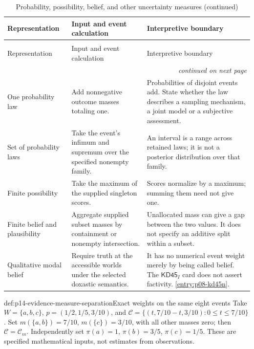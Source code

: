 \begin{longtable}{@{}p{}p{}p{}@{}}
\caption{Probability, possibility, belief, and other uncertainty measures}\\
\toprule
Representation & Input and event calculation & Interpretive boundary \\
\midrule
\endfirsthead
\caption[]{Probability, possibility, belief, and other uncertainty measures (continued)}\\
\toprule
Representation & Input and event calculation & Interpretive boundary \\
\midrule
\endhead
\midrule\multicolumn{3}{r}{\emph{continued on next page}}\\
\endfoot
\endlastfoot
One probability law & Add nonnegative outcome masses totaling one. &
Probabilities of disjoint events add. State whether the law describes a
sampling mechanism, a joint model or a subjective assessment. \\
Set of probability laws & Take the event's infimum and supremum over the
specified nonempty family. & An interval is a range across retained laws;
it is not a posterior distribution over that family. \\
Finite possibility & Take the maximum of the supplied singleton scores. &
Scores normalize by a maximum; summing them need not give one. \\
Finite belief and plausibility & Aggregate supplied subset masses by
containment or nonempty intersection. & Unallocated mass can give a gap
between the two values. It does not specify an additive split within a subset. \\
Qualitative modal belief & Require truth at the accessible worlds under the
selected doxastic semantics. & It has no numerical event weight merely by
being called belief. The \(\mathsf{KD45}_{I}\) card does not assert factivity.
\cref{entry:p08-kd45n}. \\
\bottomrule
\end{longtable}

\begin{hbexample}{def:p14-evidence-measure-separation}{Exact weights on the same eight events}
Take \(W=\{a,b,c\}\), \(p=(1/2,1/5,3/10)\), and
\(\mathcal C=\{(t,7/10-t,3/10):0\leq t\leq7/10\}\).
Set \(m(\{a,b\})=7/10\), \(m(\{c\})=3/10\), with all other
masses zero; then \(\mathcal C=\mathcal C_m\). Independently set
\(\pi(a)=1\), \(\pi(b)=3/5\), \(\pi(c)=1/5\).
These are specified mathematical inputs, not estimates from observations.
\end{hbexample}

